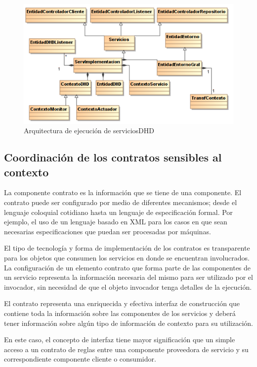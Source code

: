\begin{figure}
\begin{center}
\includegraphics[width=5 in,totalheight=3.2 in]{Ch4/jcaf.png}
\caption{Arquitectura de ejecución de serviciosDHD}
\label{hiperplanos}
\end{center}
\end{figure}


\subsection{Coordinación de los contratos sensibles al contexto}

La componente contrato es la información que se tiene de una componente. El contrato puede ser configurado por medio de diferentes mecanismos; desde el lenguaje coloquial cotidiano hasta un lenguaje de especificación formal. Por ejemplo, el uso de un lenguaje basado en XML para los casos en que sean necesarias especificaciones que puedan ser procesadas por máquinas.

El tipo de tecnología y forma de implementación de los contratos es transparente para los objetos que consumen los servicios en donde se encuentran involucrados. La configuración de un elemento contrato que forma parte de las componentes de un servicio representa la información necesaria del mismo para ser utilizado por el invocador, sin necesidad de que el objeto invocador tenga detalles de la ejecución.

El contrato representa una enriquecida y efectiva interfaz de construcción que contiene toda la información sobre las componentes de los servicios y deberá tener información sobre algún tipo de información de contexto para su utilización.

En este caso, el concepto de interfaz tiene mayor significación que un simple acceso a un contrato de reglas entre una  componente proveedora de servicio y su correspondiente componente cliente o consumidor.

